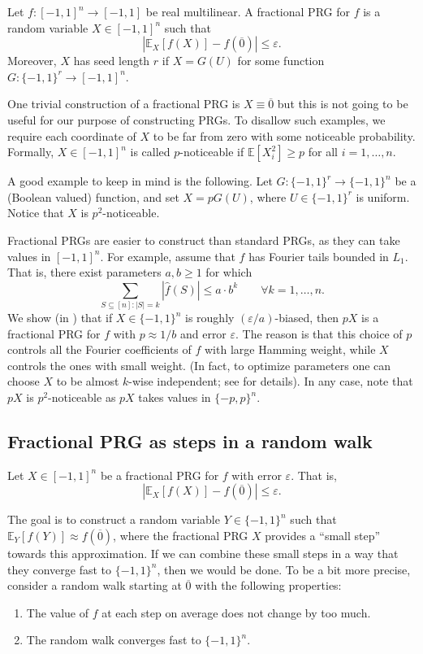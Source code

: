 \documentclass{toc}
\newcommand{\E}{\mathbb{E}}
\newcommand{\eps}{\varepsilon}
\newcommand{\zero}{\overline{0}}
\begin{document}
\begin{definition}
Let $f:[-1,1]^n \to [-1,1]$ be real multilinear. A fractional PRG for $f$ is a random variable $X \in [-1,1]^n$ such that
$$
|\E_X[f(X)] - f(\zero)| \le \eps.
$$
	Moreover, $X$ has seed length $r$ if $X = G(U)$ for some function $G:\{-1,1\}^r \to [-1,1]^n$.
\end{definition}

One trivial construction of a fractional PRG is $X\equiv \zero$ but this is not going to be useful for our purpose of constructing PRGs.
To disallow such examples, we require each coordinate of $X$ to be far from zero with some noticeable probability. Formally, $X \in [-1,1]^n$ is called $p$-noticeable
if $\E[X_i^2] \ge p$ for all $i=1,\ldots,n$.

A good example to keep in mind is the following. Let $G: \{ -1,1\}^r \rightarrow \{-1,1\}^{n}$ be a (Boolean valued) function,
and set $X=p G(U)$, where $U \in \{-1,1\}^r$ is uniform. Notice that $X$ is $p^2$-noticeable.
%
%

Fractional PRGs are easier to construct than standard PRGs, as they can take values in $[-1,1]^n$. For example, assume that $f$ has Fourier tails
bounded in $L_1$. That is,  there exist parameters $a,b \ge 1$ for which
$$
\sum_{S \subseteq [n]: |S|=k} |\hat{f}(S)| \le a \cdot b^k \qquad \forall k=1,\ldots,n.
$$
We show (in ) that if $X \in \{-1,1\}^n$ is roughly $(\eps/a)$-biased, then $pX$ is a fractional PRG for $f$ with $p \approx 1/b$ and error $\eps$. The reason is that
this choice of $p$ controls all the Fourier coefficients of $f$ with large Hamming weight, while $X$ controls the ones with small weight.
(In fact, to optimize parameters one can choose $X$ to be almost $k$-wise independent; see  for details).
In any case, note that $pX$ is $p^2$-noticeable as $pX$ takes values in $\{-p,p\}^n$.

\subsection{Fractional PRG as steps in a random walk}

Let $X \in [-1,1]^n$ be a fractional PRG for $f$ with error $\eps$. That is,
$$
|\E_X[f(X)] - f(\zero)| \le \eps.
$$


The goal is to construct a random variable $Y \in \{-1,1\}^n$ such that $\E_Y[f(Y)] \approx f(\zero)$, where the fractional PRG $X$ provides
a ``small step'' towards this approximation. If we can combine these small steps in a way that they converge fast to $\{-1,1\}^n$, then we would be done. To be a bit more precise, consider a random walk starting at $\zero$  with the following properties:
\begin{enumerate}
\item The value of $f$ at each step on average does not change by too much.
\item The random walk converges fast to $\{-1,1\}^n$.
\end{enumerate}
\end{document}
